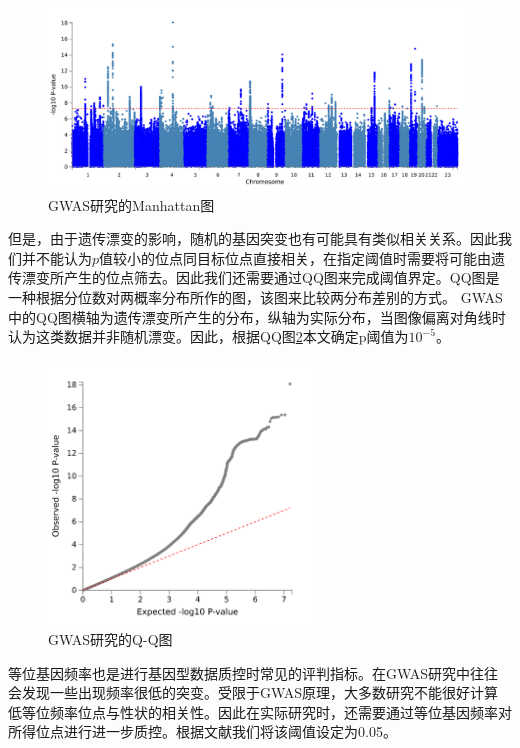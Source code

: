 \begin{figure}[!ht]
\centering
\includegraphics[width=\textwidth]{figures/Chapter2/Maha.png}
\caption{GWAS研究的Manhattan图} \label{fig:manhattan}
\end{figure}

但是，由于遗传漂变的影响，随机的基因突变也有可能具有类似相关关系。因此我们并不能认为$p$值较小的位点同目标位点直接相关，在指定阈值时需要将可能由遗传漂变所产生的位点筛去。因此我们还需要通过QQ图来完成阈值界定。QQ图是一种根据分位数对两概率分布所作的图，该图来比较两分布差别的方式。\cite{wilk_probability_1968} GWAS中的QQ图横轴为遗传漂变所产生的分布，纵轴为实际分布，当图像偏离对角线时认为这类数据并非随机漂变。因此，根据QQ图\ref{fig:qqplot}本文确定p阈值为$10^{-5}$。

\begin{figure}[!ht]
\centering
\includegraphics[width=7cm]{figures/Chapter2/qq.png}
\caption{GWAS研究的Q-Q图} \label{fig:qqplot}
\end{figure}


等位基因频率也是进行基因型数据质控时常见的评判指标。在GWAS研究中往往会发现一些出现频率很低的突变。受限于GWAS原理，大多数研究不能很好计算低等位频率位点与性状的相关性。因此在实际研究时，还需要通过等位基因频率对所得位点进行进一步质控。根据文献我们将该阈值设定为0.05\cite{marees_tutorial_2018}。

